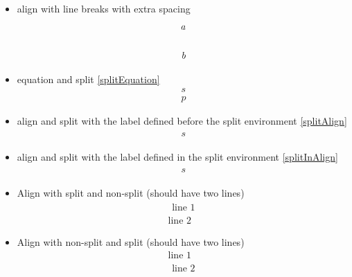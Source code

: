 \documentclass{article}
\def\ifautonum#1{#1}%
\def\ifautonum#1{}%
\begin{document}
\begin{itemize}
{		}
		\item align with line breaks with extra spacing
			\begin{align}
				a
				\\[\baselineskip]
				b
			\end{align}
		\ifautonum{
			\item shortcut and split \ref{split} \[ \label{split}\begin{split} s \\ p \end{split} \] (needs autonum)
		}
		\item equation and split \ref{splitEquation} \begin{equation} \label{splitEquation}\begin{split} s \\ p \end{split} \end{equation}
		\item align and split with the label defined before the split environment \ref{splitAlign}
			\begin{align}
				\label{splitAlign}
				\begin{split}
					s
				\end{split}
			\end{align}
			\makeatletter
			\makeatother
		\item align and split with the label defined in the split environment \ref{splitInAlign}
			\begin{align}
				\begin{split}
					s\label{splitInAlign}
				\end{split}
			\end{align}
		\item Align with split and non-split (should have two lines)
			\begin{align}
				\begin{split}
					\text{line 1}
				\end{split}
				\\
				\text{line 2}
			\end{align}
		\item Align with non-split and split (should have two lines)
			\begin{align}
				\text{line 1}
				\\
				\begin{split}
					\text{line 2}
				\end{split}
			\end{align}

\end{itemize}
\end{document}
